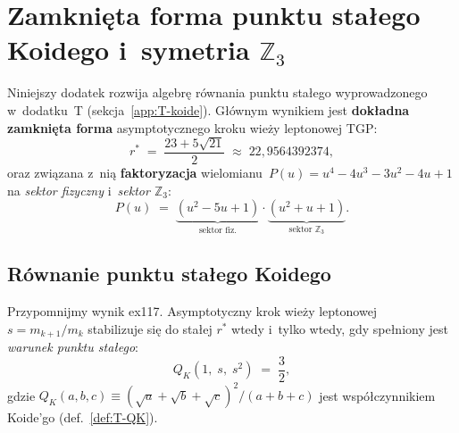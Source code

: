 \section{Zamkni\k{e}ta forma punktu sta\l{}ego Koidego i~symetria
  $\mathbb{Z}_3$}%
\label{app:T2-fp-algebra}

Niniejszy dodatek rozwija algebr\k{e} r\'ownania punktu sta\l{}ego
wyprowadzonego w~dodatku~T (sekcja~\ref{app:T-koide}).
G\l{}\'ownym wynikiem jest \textbf{dok\l{}adna zamkni\k{e}ta forma}
asymptotycznego kroku wie\.zy leptonowej TGP:
\begin{equation}\label{eq:T2-rstar-exact}
  \boxed{r^* \;=\; \frac{23 + 5\sqrt{21}}{2} \;\approx\; 22{,}9564392374,}
\end{equation}
oraz zwi\k{a}zana z~ni\k{a} \textbf{faktoryzacja}
wielomianu~$P(u) = u^4-4u^3-3u^2-4u+1$ na \emph{sektor fizyczny}
i~\emph{sektor $\mathbb{Z}_3$}:
\begin{equation}\label{eq:T2-factor}
  \boxed{P(u) \;=\; \underbrace{(u^2-5u+1)}_{\text{sektor fiz.}}
                \cdot \underbrace{(u^2+u+1)}_{\text{sektor }\mathbb{Z}_3}.}
\end{equation}


\subsection{R\'ownanie punktu sta\l{}ego Koidego}\label{app:T2-fpeq}

Przypomnijmy wynik ex117.
Asymptotyczny krok wie\.zy leptonowej
$s = m_{k+1}/m_k$ stabilizuje si\k{e} do sta\l{}ej $r^*$
wtedy i~tylko wtedy, gdy spe\l{}niony jest \emph{warunek punktu sta\l{}ego}:
\begin{equation}\label{eq:T2-fp-condition}
  Q_K(1,\; s,\; s^2) \;=\; \frac{3}{2},
\end{equation}
gdzie $Q_K(a,b,c) \equiv (\sqrt{a}+\sqrt{b}+\sqrt{c})^2/(a+b+c)$
jest wsp\'o\l{}czynnikiem Koide'go (def.~\ref{def:T-QK}).

